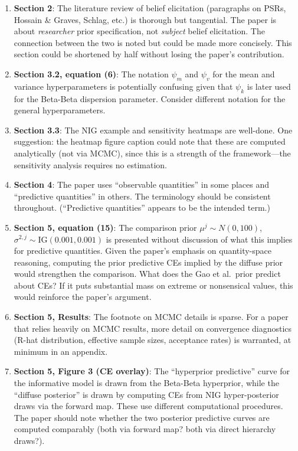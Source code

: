 \documentclass[12pt]{article}
\begin{document}
\begin{enumerate}[leftmargin=*]

\item \textbf{Section 2}: The literature review of belief elicitation
(paragraphs on PSRs, Hossain \& Graves, Schlag, etc.) is thorough but
tangential. The paper is about \textit{researcher} prior specification, not
\textit{subject} belief elicitation. The connection between the two is noted
but could be made more concisely. This section could be shortened by half
without losing the paper's contribution.

\item \textbf{Section 3.2, equation (6)}: The notation $\psi_m$ and $\psi_v$
for the mean and variance hyperparameters is potentially confusing given that
$\psi_k$ is later used for the Beta-Beta dispersion parameter. Consider
different notation for the general hyperparameters.

\item \textbf{Section 3.3}: The NIG example and sensitivity heatmaps are
well-done. One suggestion: the heatmap figure caption could note that these
are computed analytically (not via MCMC), since this is a strength of the
framework---the sensitivity analysis requires no estimation.

\item \textbf{Section 4}: The paper uses ``observable quantities'' in some
places and ``predictive quantities'' in others. The terminology should be
consistent throughout. (``Predictive quantities'' appears to be the intended
term.)

\item \textbf{Section 5, equation (15)}: The comparison prior
$\mu^j \sim N(0, 100)$, $\sigma^{2,j} \sim \text{IG}(0.001, 0.001)$ is
presented without discussion of what this implies for predictive quantities.
Given the paper's emphasis on quantity-space reasoning, computing the prior
predictive CEs implied by the diffuse prior would strengthen the comparison.
What does the Gao et al.\ prior predict about CEs? If it puts substantial
mass on extreme or nonsensical values, this would reinforce the paper's
argument.

\item \textbf{Section 5, Results}: The footnote on MCMC details is sparse.
For a paper that relies heavily on MCMC results, more detail on convergence
diagnostics (R-hat distribution, effective sample sizes, acceptance rates)
is warranted, at minimum in an appendix.

\item \textbf{Section 5, Figure 3 (CE overlay)}: The ``hyperprior predictive''
curve for the informative model is drawn from the Beta-Beta hyperprior, while
the ``diffuse posterior'' is drawn by computing CEs from NIG hyper-posterior
draws via the forward map. These use different computational procedures. The
paper should note whether the two posterior predictive curves are computed
comparably (both via forward map? both via direct hierarchy draws?).


\end{enumerate}
\end{document}
